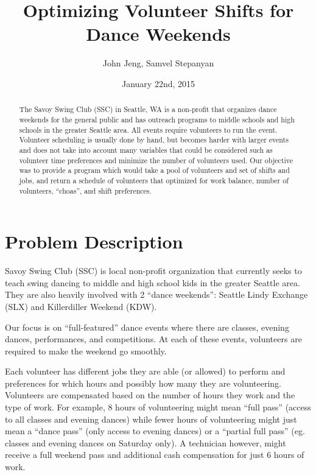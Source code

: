 \documentclass[12pt]{article}
\title{Optimizing Volunteer Shifts for Dance Weekends}
\author{John Jeng, Samvel Stepanyan}
\date{January 22nd, 2015}
\theoremstyle{definition}
\begin{document}
\maketitle
\begin{abstract}
	The Savoy Swing Club (SSC) in Seattle, WA is a non-profit that organizes dance weekends for the general public and has outreach programs to middle schools and high schools in the greater Seattle area. All events require volunteers to run the event. Volunteer scheduling is usually done by hand, but becomes harder with larger events and does not take into account many variables that could be considered such as volunteer time preferences and minimize the number of volunteers used. Our objective was to provide a program which would take a pool of volunteers and set of shifts and jobs, and return a schedule of volunteers that optimized for work balance, number of volunteers, ``choas'', and shift preferences.
\end{abstract}
\newpage
\tableofcontents
\newpage

\section{Problem Description}

Savoy Swing Club (SSC) is local non-profit organization that currently seeks to teach swing dancing to middle and high school kids in the greater Seattle area.
They are also heavily involved with 2 “dance weekends”: Seattle Lindy Exchange (SLX) and Killerdiller Weekend (KDW).

Our focus is on ``full-featured'' dance events where there are classes, evening dances, performances, and competitions.
At each of these events, volunteers are required to make the weekend go smoothly.

Each volunteer has different jobs they are able (or allowed) to perform and preferences for which hours and possibly how many they are volunteering.
Volunteers are compensated based on the number of hours they work and the type of work.
For example, 8 hours of volunteering might mean “full pass” (access to all classes and evening dances) while fewer hours of volunteering might just mean a “dance pass” (only access to evening dances) or a “partial full pass” (eg. classes and evening dances on Saturday only).
A technician however, might receive a full weekend pass and additional cash compensation for just 6 hours of work.
\end{document}
